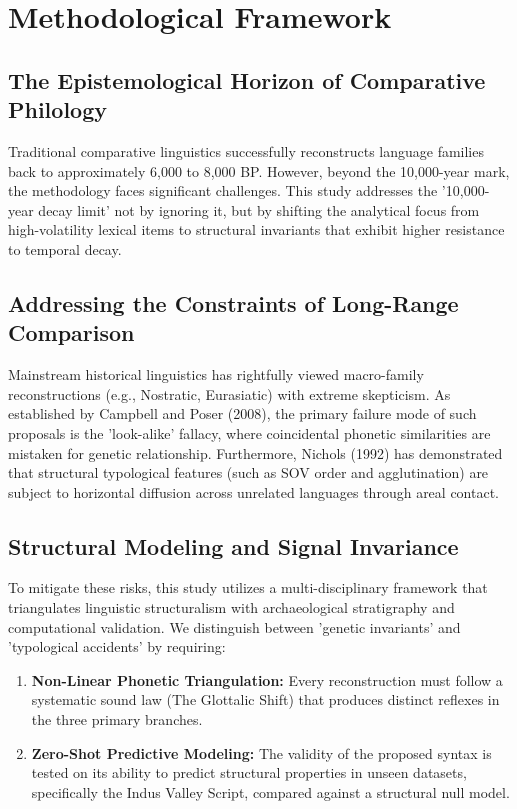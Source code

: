 \chapter{Methodological Framework}

\section{The Epistemological Horizon of Comparative Philology}
Traditional comparative linguistics successfully reconstructs language families back to approximately 6,000 to 8,000 BP. However, beyond the 10,000-year mark, the methodology faces significant challenges. This study addresses the '10,000-year decay limit' not by ignoring it, but by shifting the analytical focus from high-volatility lexical items to structural invariants that exhibit higher resistance to temporal decay.

\section{Addressing the Constraints of Long-Range Comparison}
Mainstream historical linguistics has rightfully viewed macro-family reconstructions (e.g., Nostratic, Eurasiatic) with extreme skepticism. As established by Campbell and Poser (2008), the primary failure mode of such proposals is the 'look-alike' fallacy, where coincidental phonetic similarities are mistaken for genetic relationship. Furthermore, Nichols (1992) has demonstrated that structural typological features (such as SOV order and agglutination) are subject to horizontal diffusion across unrelated languages through areal contact.

\section{Structural Modeling and Signal Invariance}
To mitigate these risks, this study utilizes a multi-disciplinary framework that triangulates linguistic structuralism with archaeological stratigraphy and computational validation. We distinguish between 'genetic invariants' and 'typological accidents' by requiring:
\begin{enumerate}
    \item \textbf{Non-Linear Phonetic Triangulation:} Every reconstruction must follow a systematic sound law (The Glottalic Shift) that produces distinct reflexes in the three primary branches.
    \item \textbf{Zero-Shot Predictive Modeling:} The validity of the proposed syntax is tested on its ability to predict structural properties in unseen datasets, specifically the Indus Valley Script, compared against a structural null model.
\end{enumerate}

